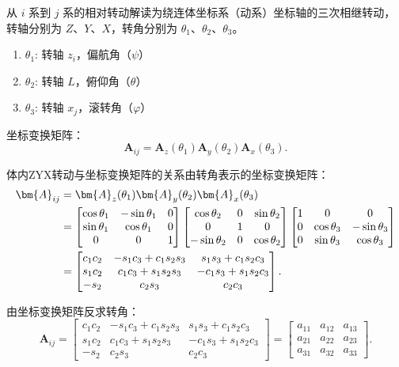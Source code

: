 从 $i$ 系到 $j$ 系的相对转动解读为绕连体坐标系（动系）坐标轴的三次相继转动，转轴分别为 $Z$、$Y$、$X$，转角分别为 $\theta_1$、$\theta_2$、$\theta_3$。

\begin{enumerate}
    \item $\theta_1$: 转轴 $z_i$，偏航角（$\psi$）
    \item $\theta_2$: 转轴 $L$，俯仰角（$\theta$）
    \item $\theta_3$: 转轴 $x_j$，滚转角（$\varphi$）
\end{enumerate}

坐标变换矩阵：
\begin{equation}
    \bm{A}_{ij} = \bm{A}_z(\theta_1)\bm{A}_y(\theta_2)\bm{A}_x(\theta_3).
\end{equation}

体内ZYX转动与坐标变换矩阵的关系\quad 由转角表示的坐标变换矩阵：
\begin{align}
    \bm{A}_{ij} &= \bm{A}_z(\theta_1)\bm{A}_y(\theta_2)\bm{A}_x(\theta_3)\notag\\
    &= \begin{bmatrix}
        \cos\theta_1 & -\sin\theta_1 & 0\\
        \sin\theta_1 & \cos\theta_1 & 0\\
        0 & 0 & 1
    \end{bmatrix}
    \begin{bmatrix}
        \cos\theta_2 & 0 & \sin\theta_2\\
        0 & 1 & 0\\
        -\sin\theta_2 & 0 & \cos\theta_2
    \end{bmatrix}
    \begin{bmatrix}
        1 & 0 & 0\\
        0 & \cos\theta_3 & -\sin\theta_3\\
        0 & \sin\theta_3 & \cos\theta_3
    \end{bmatrix}\notag\\
    &= \begin{bmatrix}
        c_1c_2 & -s_1c_3 + c_1s_2s_3 & s_1s_3 + c_1s_2c_3\\
        s_1c_2 & c_1c_3 + s_1s_2s_3 & -c_1s_3 + s_1s_2c_3\\
        -s_2 & c_2s_3 & c_2c_3
    \end{bmatrix}.
\end{align}

由坐标变换矩阵反求转角：
\begin{equation}
    \bm{A}_{ij} = \begin{bmatrix}
        c_1c_2 & -s_1c_3 + c_1s_2s_3 & s_1s_3 + c_1s_2c_3\\
        s_1c_2 & c_1c_3 + s_1s_2s_3 & -c_1s_3 + s_1s_2c_3\\
        -s_2 & c_2s_3 & c_2c_3
    \end{bmatrix}
    = \begin{bmatrix}
        a_{11} & a_{12} & a_{13}\\
        a_{21} & a_{22} & a_{23}\\
        a_{31} & a_{32} & a_{33}
    \end{bmatrix}.
\end{equation}

